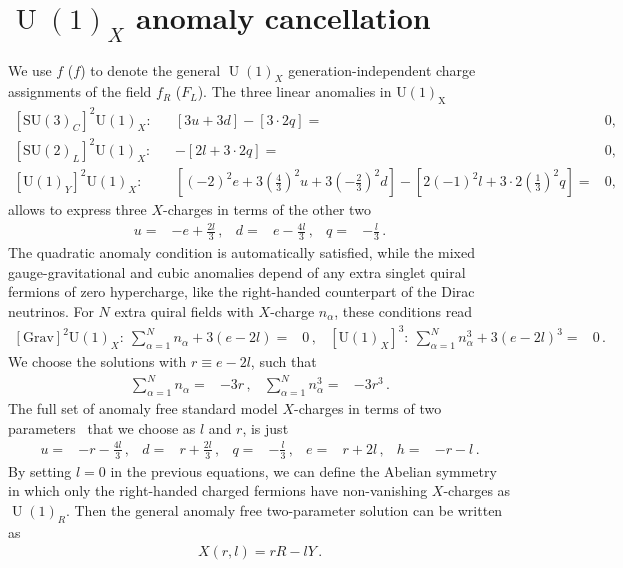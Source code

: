 \documentclass[12pt]{article}
\begin{document}
\section{$\operatorname{U}(1)_X$ anomaly cancellation }
We use $f$ ($f$) to denote the general $\operatorname{U}(1)_X$ generation-independent charge assignments of the field $f_R$ ($F_L$). The three linear anomalies in $\operatorname{U(1)_X}$~\cite{Campos:2017dgc}
\begin{align}
  \label{eq:anolin}
  \left[\mathrm{SU}(3)_{C}\right]^{2} \mathrm{U}(1)_{X} :& &
[3 u+3 d]-[3 \cdot 2 q]=&0, \nonumber\\
\left[\mathrm{SU}(2)_{L}\right]^{2} \mathrm{U}(1)_{X} :&&
-[2 l+3 \cdot 2 q]=&0, \nonumber\\
\left[\mathrm{U}(1)_{Y}\right]^{2} \mathrm{U}(1)_{X} :&&
{ \left[(-2)^{2} e+3\left(\tfrac{4}{3}\right)^{2} u+3\left(-\tfrac{2}{3}\right)^{2} d\right]-\left[2(-1)^{2} l+3 \cdot 2\left(\tfrac{1}{3}\right)^{2} q\right]}=&
 0,
  \end{align}
allows to express three $X$-charges in terms of the other two
\begin{align}
  u=&-e+\frac{2l}{3}\,,& d=& e-\frac{4l}{3}\,,& q=& -\frac{l}{3}\,.
\end{align}
The quadratic anomaly condition is automatically satisfied, while the mixed gauge-gravitational and cubic anomalies depend of any extra singlet quiral fermions of zero hypercharge, like the right-handed counterpart of the Dirac neutrinos. For $N$ extra quiral fields with $X$-charge $n_{\alpha}$, these conditions read
\begin{align}
  \left[\text{Grav}\right]^{2} \mathrm{U}(1)_{X}:\ \sum_{\alpha=1}^N n_{\alpha}+3 (e-2l)=&0\,, &  \left[\mathrm{U}(1)_{X}\right]^{3}:\ \sum_{\alpha=1}^N n_{\alpha}^3+3 (e-2l)^3=&0\,. &
\end{align}
We choose the solutions with $r\equiv e-2l$, such that
\begin{align}
  \label{eq:anolam}
  \sum_{\alpha=1}^{N} n_{\alpha}=&-3 r\,,   & \sum_{\alpha=1}^{N} n_{\alpha}^3=&-3 r^3\,.
\end{align}
The full set of anomaly free standard model $X$-charges in terms of two parameters~\cite{Appelquist:2002mw,Campos:2017dgc} that we choose as $l$ and $r$, is just
\begin{align}
  u=&-r-\frac{4l}{3}\,,&d=&r+\frac{2l}{3}\,,&q=&-\frac{l}{3}\,,&e=&r+2l\,,&h=&-r-l\,.
  \label{Eq:SMCharges}
\end{align}
By setting $l=0$ in the previous equations, we can define the Abelian symmetry in which only the right-handed charged fermions have non-vanishing $X$-charges as $\operatorname{U}(1)_R$. Then the general anomaly free two-parameter solution can be written as
\begin{align}
  X(r,l)=r R- l Y\,.
\end{align}
\end{document}
